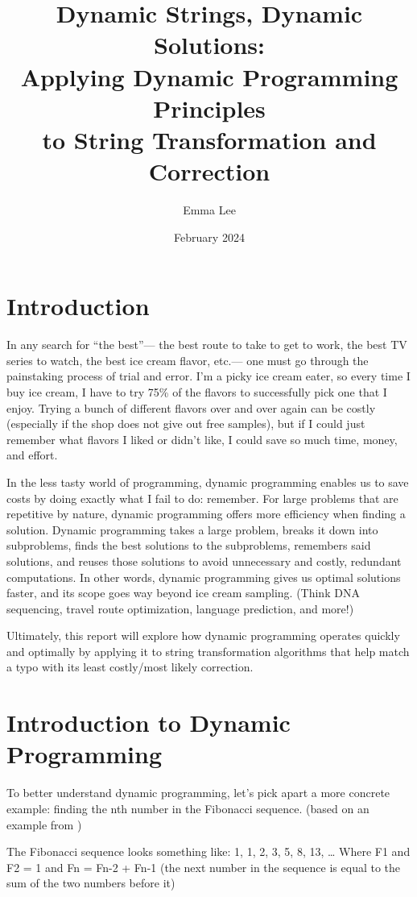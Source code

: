 \documentclass[12pt,letterpaper]{article}
\title{Dynamic Strings, Dynamic Solutions: 
    \\\Large Applying Dynamic Programming Principles\\to String Transformation and Correction}
\author{Emma Lee}
\date{February 2024}
\begin{document}
\maketitle

\section{Introduction}
In any search for “the best”— the best route to take to get to work, the best TV series to watch, the best ice cream flavor, etc.— one must go through the painstaking process of trial and error. I’m a picky ice cream eater, so every time I buy ice cream, I have to try 75\% of the flavors to successfully pick one that I enjoy. Trying a bunch of different flavors over and over again can be costly (especially if the shop does not give out free samples), but if I could just remember what flavors I liked or didn’t like, I could save so much time, money, and effort. 

In the less tasty world of programming, dynamic programming enables us to save costs by doing exactly what I fail to do: remember. For large problems that are repetitive by nature, dynamic programming offers more efficiency when finding a solution. Dynamic programming takes a large problem, breaks it down into subproblems, finds the best solutions to the subproblems, remembers said solutions, and reuses those solutions to avoid unnecessary and costly, redundant computations. In other words, dynamic programming gives us optimal solutions faster, and its scope goes way beyond ice cream sampling. (Think DNA sequencing, travel route optimization, language prediction, and more!)

Ultimately, this report will explore how dynamic programming operates quickly and optimally by applying it to string transformation algorithms that help match a typo with its least costly/most likely correction.

\section{Introduction to Dynamic Programming}
To better understand dynamic programming, let’s pick apart a more concrete example: finding the nth number in the Fibonacci sequence. (based on an example from \cite{sugishita})

\begin{small}
    \begin{spverbatim}
    The Fibonacci sequence looks something like:
        1, 1, 2, 3, 5, 8, 13, …
    Where F1 and F2 = 1 and Fn = Fn-2 + Fn-1 (the next number in the 
    sequence is equal to the sum of the two numbers before it)
    \end{spverbatim}
\end{small}
\end{document}
